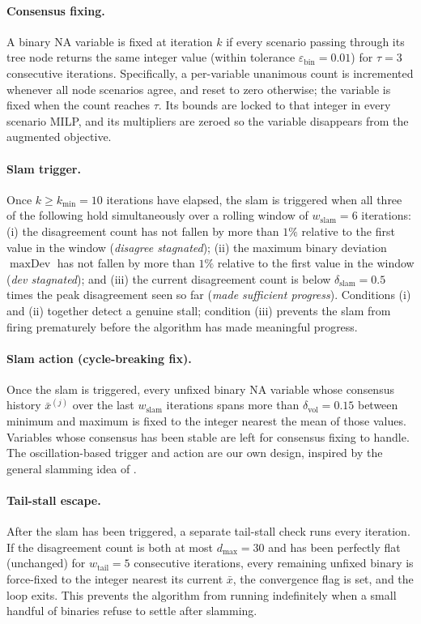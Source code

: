 \documentclass[12pt,a4paper]{article}
\begin{document}
\paragraph{Consensus fixing.}
A binary NA variable is fixed at iteration $k$ if every scenario passing through its tree node returns the same integer value (within tolerance $\varepsilon_{\mathrm{bin}}=0.01$) for $\tau = 3$ consecutive iterations. Specifically, a per-variable unanimous count is incremented whenever all node scenarios agree, and reset to zero otherwise; the variable is fixed when the count reaches $\tau$. Its bounds are locked to that integer in every scenario MILP, and its multipliers are zeroed so the variable disappears from the augmented objective.

\paragraph{Slam trigger.}
Once $k \geq k_{\min} = 10$ iterations have elapsed, the slam is triggered when all three of the following hold simultaneously over a rolling window of $w_{\mathrm{slam}} = 6$ iterations: (i) the disagreement count has not fallen by more than $1\%$ relative to the first value in the window (\emph{disagree stagnated}); (ii) the maximum binary deviation $\max\text{Dev}$ has not fallen by more than $1\%$ relative to the first value in the window (\emph{dev stagnated}); and (iii) the current disagreement count is below $\delta_{\mathrm{slam}} = 0.5$ times the peak disagreement seen so far (\emph{made sufficient progress}). Conditions (i) and (ii) together detect a genuine stall; condition (iii) prevents the slam from firing prematurely before the algorithm has made meaningful progress.

\paragraph{Slam action (cycle-breaking fix).}
Once the slam is triggered, every unfixed binary NA variable whose consensus history $\bar{x}^{(j)}$ over the last $w_{\mathrm{slam}}$ iterations spans more than $\delta_{\mathrm{vol}} = 0.15$ between minimum and maximum is fixed to the integer nearest the mean of those values. Variables whose consensus has been stable are left for consensus fixing to handle. The oscillation-based trigger and action are our own design, inspired by the general slamming idea of \citet{watson2011progressive}.

\paragraph{Tail-stall escape.}
After the slam has been triggered, a separate tail-stall check runs every iteration. If the disagreement count is both at most $d_{\max} = 30$ and has been perfectly flat (unchanged) for $w_{\mathrm{tail}} = 5$ consecutive iterations, every remaining unfixed binary is force-fixed to the integer nearest its current $\bar{x}$, the convergence flag is set, and the loop exits. This prevents the algorithm from running indefinitely when a small handful of binaries refuse to settle after slamming.
\end{document}
